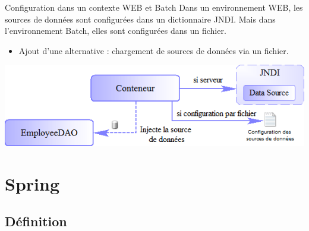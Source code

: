 \documentclass[compress]{beamer}%
\begin{document}
\begin{frame}

	\begin{exampleblock}{Configuration dans un contexte WEB et Batch}
		Dans un environnement WEB, les sources de données sont configurées dans un dictionnaire JNDI. Mais dans l'environnement Batch, elles sont configurées dans un fichier.
	\end{exampleblock}

	\pause
	\begin{itemize}
		\item Ajout d'une alternative : chargement de sources de données via un fichier.
	\end{itemize}


	\pause
	\includegraphics[width=\textwidth]{images/spring_datasource_with_full.png}
\end{frame}



\section{Spring}

\subsection{Définition}

\end{document}
